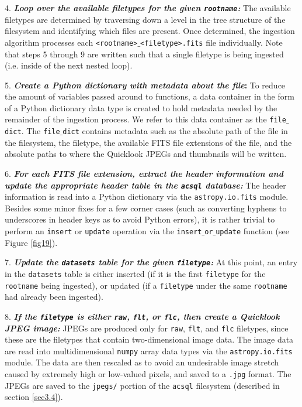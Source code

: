 \documentclass[10pt,journal,compsoc]{IEEEtran}
\begin{document}
4. \textbf{\textit{Loop over the available filetypes for the given \texttt{rootname}:}} The available filetypes are determined by traversing down a level in the tree
structure of the filesystem and identifying which files are present. Once determined, the ingestion algorithm processes each \texttt{<rootname>$\_$<filetype>.fits} file individually.
Note that steps 5 through 9 are written such that a single filetype is being ingested (i.e. inside of the next nested loop).

5. \textbf{\textit{Create a Python dictionary with metadata about the file}:}  To reduce the amount of variables passed around to functions, a data container in the form of
a Python dictionary data type is created to hold metadata needed by the remainder of the ingestion process.  We refer to this data container as the \texttt{file$\_$dict}.  The
\texttt{file$\_$dict} contains metadata such as the absolute path of the file in the filesystem, the filetype, the available FITS file extensions of the file, and the absolute
paths to where the Quicklook JPEGs and thumbnails will be written.

6. \textbf{\textit{For each FITS file extension, extract the header information and update the appropriate header table in the \texttt{acsql} database:}}  The header information
is read into a Python dictionary via the \texttt{astropy.io.fits} module.  Besides some minor fixes for a few corner cases (such as converting hyphens to underscores in header keys as to avoid
Python errors), it is rather trivial to perform an \texttt{insert} or \texttt{update} operation via the \texttt{insert$\_$or$\_$update} function (see Figure \ref{fig19}).

7. \textbf{\textit{Update the \texttt{datasets} table for the given \texttt{filetype}:}} At this point, an entry in the \texttt{datasets} table is either inserted (if it is the first
\texttt{filetype} for the \texttt{rootname} being ingested), or updated (if a \texttt{filetype} under the same \texttt{rootname} had already been ingested).

8. \textbf{\textit{If the \texttt{filetype} is either \texttt{raw}, \texttt{flt}, or \texttt{flc}, then create a Quicklook JPEG image:}}  JPEGs are produced only for \texttt{raw},
\texttt{flt}, and \texttt{flc} filetypes, since these are the filetypes that contain two-dimensional image data.  The image data are read into multidimensional \texttt{numpy} array
data types via the \texttt{astropy.io.fits} module.  The data are then rescaled as to avoid an undesirable image stretch caused by extremely high or low-valued pixels, and saved to a
\texttt{.jpg} format.  The JPEGs are saved to the \texttt{jpegs/} portion of the \texttt{acsql} filesystem (described in section \ref{sec3.4}).
\end{document}

